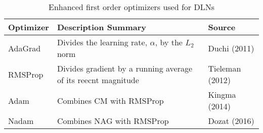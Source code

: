 \documentclass[preprint,12pt,a4paper,authoryear]{elsarticle}
\begin{document}
\begin{table}[H]
\centering
\caption{Enhanced first order optimizers used for DLNs}
\label{tb-optimizers}
\scriptsize
\begin{tabular}{@{}p{2cm}p{8cm}p{2.5cm}@{}}
\toprule
\textbf{Optimizer} & \textbf{Description Summary} & \textbf{Source} \\ \midrule
AdaGrad & Divides the learning rate, $\alpha$, by the $L_{2}$ norm & Duchi (2011) \\
RMSProp & Divides gradient by a running average of its reecnt magnitude & Tieleman (2012) \\
Adam & Combines CM with RMSProp & Kingma (2014) \\
Nadam & Combines NAG with RMSProp & Dozat (2016) \\ \bottomrule
\end{tabular}
\end{table}	
\end{document}
